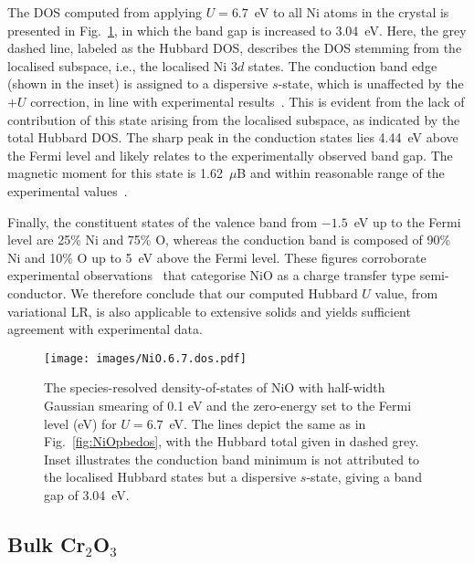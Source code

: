 %
The DOS computed from applying 
$U=6.7$~eV to all Ni atoms in the crystal 
is presented in Fig.~\ref{fig:NiO6.7dos}, 
in which the band gap is increased to 3.04~eV.
%
Here, the grey dashed line, 
labeled as the Hubbard DOS, 
describes the DOS stemming from the localised subspace, 
i.e., the localised Ni 3$d$ states.
%
The conduction band edge 
(shown in the inset)
is assigned to a dispersive $s$-state, 
which is unaffected by the $+U$ correction, 
in line with experimental 
results~\cite{Hufner1992,PhysRevB.79.045118,PhysRevB.62.16392}.
%
This is evident from the lack of contribution 
of this state arising from the localised subspace, 
as indicated by the total Hubbard DOS.
%
The sharp peak in the conduction states  
lies 4.44~eV above the Fermi level 
and likely relates to the 
experimentally observed band gap.
%
The magnetic moment for this state 
is 1.62~$\mu$B and within reasonable 
range of the experimental values~\cite{alperin1962nio,PhysRevB.27.6964}.

Finally, the constituent states of the 
valence band from $-1.5$~eV 
up to the Fermi level are 
25\% Ni and 75\% O, 
whereas the conduction band is composed of 
90\% Ni and 10\% O 
up to 5~eV above the Fermi level.
%
These figures corroborate 
experimental observations~\cite{PhysRevB.43.14674,PhysRevLett.53.2339} 
that categorise NiO 
as a charge transfer type semi-conductor.
%
We therefore conclude that our 
computed Hubbard $U$ value, 
from variational LR, 
is also applicable to extensive solids 
and yields sufficient agreement 
with experimental data.


\begin{figure}[th!]
\centering
\texttt{[image: images/NiO.6.7.dos.pdf]}
\caption[Species-resolved DOS for NiO calculated with PBE+$U$]
{The species-resolved density-of-states of NiO 
with half-width Gaussian smearing of 0.1 eV 
and the zero-energy set to the Fermi level (eV) 
for $U=6.7$~eV.
%
The lines depict the same as in Fig.~\ref{fig:NiOpbedos}, 
with the Hubbard total given in dashed grey.
%
Inset illustrates the conduction band minimum 
is not attributed to the localised Hubbard states 
but a dispersive $s$-state, 
giving a band gap of 3.04~eV.
}
\label{fig:NiO6.7dos}
\end{figure}





\subsection{Bulk Cr$_2$O$_3$}

